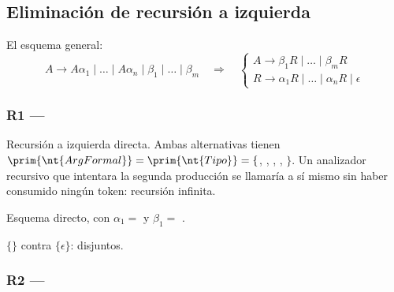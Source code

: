 \subsection{Eliminación de recursión a izquierda}

El esquema general:
\[ A \to A\alpha_1 \mid \dots \mid A\alpha_n \mid \beta_1 \mid \dots \mid \beta_m
\quad\Longrightarrow\quad
\begin{cases} A \to \beta_1 R \mid \dots \mid \beta_m R \\ R \to \alpha_1 R \mid \dots \mid \alpha_n R \mid \epsilon \end{cases} \]

\subsubsection{R1 --- }

\begin{producciones}
\end{producciones}

 Recursión a izquierda directa. Ambas alternativas tienen
$\prim{\nt{ArgFormal}} = \prim{\nt{Tipo}} = \{$, , , ,
$\}$. Un analizador recursivo que intentara la segunda producción se llamaría a sí mismo
sin haber consumido ningún token: recursión infinita.

 Esquema directo, con $\alpha_1 =$ \tl{,}  y
$\beta_1 =$ .

\begin{producciones}
\end{producciones}
$\{$\tl{,}$\}$ contra $\{\epsilon\}$: disjuntos.

\subsubsection{R2 --- }

\begin{producciones}
\end{producciones}


